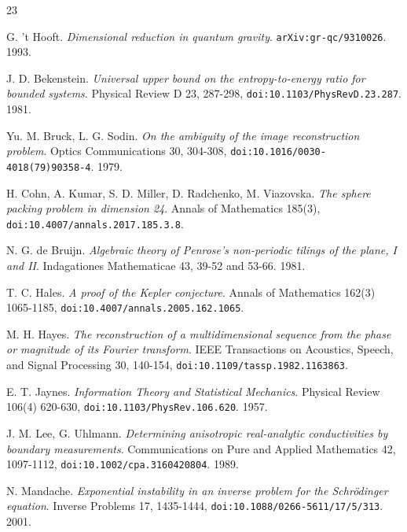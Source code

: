 \backmatter
{}
\begin{thebibliography}{23}

G. 't Hooft. \emph{Dimensional reduction in quantum gravity}. \texttt{arXiv:gr-qc/\allowbreak{}9310026}. 1993.

J. D. Bekenstein. \emph{Universal upper bound on the entropy-to-energy ratio for bounded systems}. Physical Review D 23, 287-298, \texttt{doi:10.1103/\allowbreak{}PhysRevD.23.287}. 1981.

Yu. M. Bruck, L. G. Sodin. \emph{On the ambiguity of the image reconstruction problem}. Optics Communications 30, 304-308, \texttt{doi:10.1016/\allowbreak{}0030-4018(79)90358-4}. 1979.

H. Cohn, A. Kumar, S. D. Miller, D. Radchenko, M. Viazovska. \emph{The sphere packing problem in dimension 24}. Annals of Mathematics 185(3), \texttt{doi:10.4007/\allowbreak{}annals.2017.185.3.8}.

N. G. de Bruijn. \emph{Algebraic theory of Penrose's non-periodic tilings of the plane, I and II}. Indagationes Mathematicae 43, 39-52 and 53-66. 1981.

T. C. Hales. \emph{A proof of the Kepler conjecture}. Annals of Mathematics 162(3) 1065-1185, \texttt{doi:10.4007/\allowbreak{}annals.2005.162.1065}.

M. H. Hayes. \emph{The reconstruction of a multidimensional sequence from the phase or magnitude of its Fourier transform}. IEEE Transactions on Acoustics, Speech, and Signal Processing 30, 140-154, \texttt{doi:10.1109/\allowbreak{}tassp.1982.1163863}.

E. T. Jaynes. \emph{Information Theory and Statistical Mechanics}. Physical Review 106(4) 620-630, \texttt{doi:10.1103/\allowbreak{}PhysRev.106.620}. 1957.

J. M. Lee, G. Uhlmann. \emph{Determining anisotropic real-analytic conductivities by boundary measurements}. Communications on Pure and Applied Mathematics 42, 1097-1112, \texttt{doi:10.1002/\allowbreak{}cpa.3160420804}. 1989.

N. Mandache. \emph{Exponential instability in an inverse problem for the Schrödinger equation}. Inverse Problems 17, 1435-1444, \texttt{doi:10.1088/\allowbreak{}0266-5611/\allowbreak{}17/\allowbreak{}5/\allowbreak{}313}. 2001.


\end{thebibliography}
